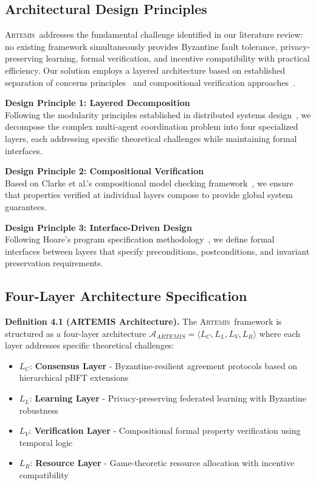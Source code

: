 \documentclass[conference]{IEEEtran}
\newcommand{\artemis}{\textsc{Artemis}}
\begin{document}
\subsection{Architectural Design Principles}

\artemis\ addresses the fundamental challenge identified in our literature review: no existing framework simultaneously provides Byzantine fault tolerance, privacy-preserving learning, formal verification, and incentive compatibility with practical efficiency. Our solution employs a layered architecture based on established separation of concerns principles~\cite{hoare1969axiomatic} and compositional verification approaches~\cite{jones1983tentative}.

\textbf{Design Principle 1: Layered Decomposition}\\
Following the modularity principles established in distributed systems design~\cite{lynch1996distributed}, we decompose the complex multi-agent coordination problem into four specialized layers, each addressing specific theoretical challenges while maintaining formal interfaces.

\textbf{Design Principle 2: Compositional Verification}\\
Based on Clarke et al.'s compositional model checking framework~\cite{clarke1989compositional}, we ensure that properties verified at individual layers compose to provide global system guarantees.

\textbf{Design Principle 3: Interface-Driven Design}\\
Following Hoare's program specification methodology~\cite{hoare1969axiomatic}, we define formal interfaces between layers that specify preconditions, postconditions, and invariant preservation requirements.

\subsection{Four-Layer Architecture Specification}

\textbf{Definition 4.1 (ARTEMIS Architecture).} The \artemis\ framework is structured as a four-layer architecture $\mathcal{A}_{ARTEMIS} = \langle L_C, L_L, L_V, L_R \rangle$ where each layer addresses specific theoretical challenges:

\begin{itemize}
    \item $L_C$: \textbf{Consensus Layer} - Byzantine-resilient agreement protocols based on hierarchical pBFT extensions
    \item $L_L$: \textbf{Learning Layer} - Privacy-preserving federated learning with Byzantine robustness
    \item $L_V$: \textbf{Verification Layer} - Compositional formal property verification using temporal logic
    \item $L_R$: \textbf{Resource Layer} - Game-theoretic resource allocation with incentive compatibility
\end{itemize}
\end{document}

